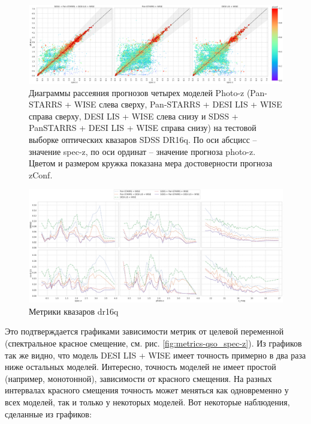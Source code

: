\documentclass[fleqn,usenatbib]{mnras}
\begin{document}
\begin{figure}
    \centering
    \includegraphics[width=0.9\linewidth]{images/scatterplots-dr16q-wo-train.png}
    \caption{Диаграммы рассеяния прогнозов четырех моделей Photo-z (Pan-STARRS + WISE слева сверху, Pan-STARRS + DESI LIS + WISE справа сверху, DESI LIS + WISE слева снизу и SDSS + PanSTARRS + DESI LIS + WISE справа снизу) на тестовой выборке оптических квазаров SDSS DR16q. По оси абсцисс -- значение spec-z, по оси ординат -- значение прогноза photo-z. Цветом и размером кружка показана мера достоверности прогноза zConf.}
    \label{fig:dr16q_wo_train}
\end{figure}

\begin{figure}
    \centering
    \includegraphics[width=0.9\linewidth]{images/metrics-dr16q-ab-mini.png}
    \caption{Метрики квазаров dr16q}
    \label{fig:metrics-cv2-gal}
\end{figure}

Это подтверждается графиками зависимости метрик от целевой переменной (спектральное красное смещение, см. рис. \ref{fig:metrics-qso_spec-z}). Из графиков так же видно, что модель DESI LIS + WISE имеет точность примерно в два раза ниже остальных моделей. Интересно, точность моделей не имеет простой (например, монотонной), зависимости от красного смещения. На разных интервалах красного смещения точность может меняться как одновременно у всех моделей, так и только у некоторых моделей. Вот некоторые наблюдения, сделанные из графиков:
\end{document}
